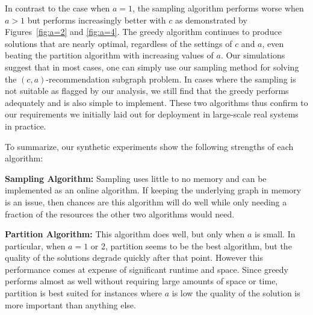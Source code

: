 In contrast to the case when $a=1$, the sampling algorithm
performs worse when $a>1$ but performs increasingly better with $c$ as
demonstrated by Figures~\ref{fig:a=2} and \ref{fig:a=4}. The greedy
algorithm continues to produce solutions that are nearly optimal,
regardless of the settings of $c$ and $a$, even beating the
partition algorithm with increasing values of $a$. Our simulations
suggest that in most cases, one can simply use our sampling method for solving the $(c, a)$-recommendation subgraph problem. In cases where the sampling is not suitable as flagged
by our analysis, we still find that the greedy performs adequately and
is also simple to implement. These two algorithms thus confirm to our
requirements we initially laid out for deployment in large-scale real
systems in practice.



To summarize, our synthetic experiments show the following strengths of each algorithm: \vs

\textbf{Sampling Algorithm:} Sampling uses little to no memory and can
be implemented as an online algorithm. If keeping the underlying graph in
memory is an issue, then chances are this algorithm will do well while only needing
a fraction of the resources the other two algorithms would need. \vs

\textbf{Partition Algorithm:} This algorithm does well, but only when $a$ is small.
In particular, when $a=1$ or 2, partition seems to be the best algorithm, but the quality
of the solutions degrade quickly after that point. However this performance comes at
expense of significant runtime and space. Since greedy performs almost as well without
requiring large amounts of space or time, partition is best suited for instances where
$a$ is low the quality of the solution is more important than anything else. \vs

